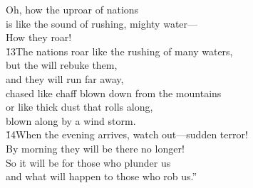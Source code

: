 \begin{poetry}
\poeml Oh, how the uproar of nations \\
\poemll    is like the sound of rushing, mighty water--- \\
\poemll    How they roar! \\
\poeml \v{13}The nations roar like the rushing of many waters, \\
\poemll    but the  will rebuke them, \\
\poeml and they will run far away, \\
\poemll    chased like chaff blown down from the mountains \\
\poeml or like thick dust that rolls along, \\
\poemll    blown along by a wind storm. \\
\poeml \v{14}When the evening arrives, watch out---sudden terror! \\
\poemll    By morning they will be there no longer! \\
\poeml So it will be for those who plunder us \\
\poemll    and what will happen to those who rob us.''
\end{poetry}

